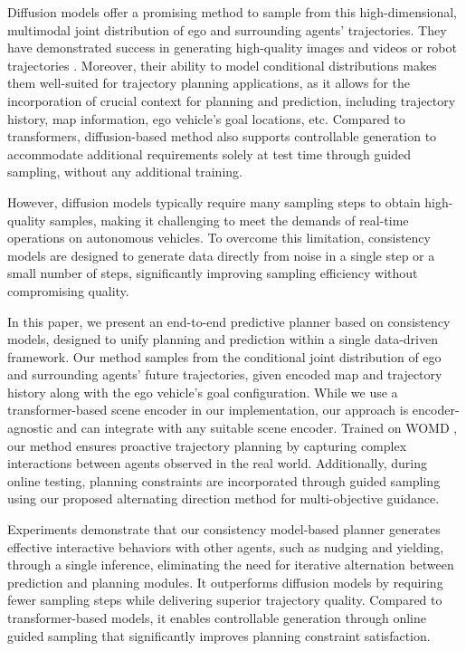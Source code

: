 Diffusion models \citep{song2020score,ho2020denoising} offer a promising method to sample from this high-dimensional, multimodal joint distribution of ego and surrounding agents' trajectories.
They have demonstrated success in generating high-quality images and videos \citep{rombach2022high,ho2022video} or robot trajectories \citep{rempe2023trace,jiang2023motiondiffuser}.
Moreover, their ability to model conditional distributions makes them well-suited for trajectory planning applications, as it allows for the incorporation of crucial context for planning and prediction, including trajectory history, map information, ego vehicle's goal locations, etc.
Compared to transformers,
diffusion-based method also supports controllable generation to accommodate additional requirements solely at test time through guided sampling, without any additional training.

However, diffusion models typically require many sampling steps to obtain high-quality samples, making it challenging to meet the demands of real-time operations on autonomous vehicles.
To overcome this limitation, consistency models \citep{song2023consistency} are designed to generate data directly from noise in a single step or a small number of steps, significantly improving sampling efficiency without compromising quality. 

In this paper, we present an end-to-end predictive planner based on consistency models, designed to unify planning and prediction within a single data-driven framework.
Our method samples from the conditional joint distribution of ego and surrounding agents' future trajectories, given encoded map and trajectory history along with the ego vehicle's goal configuration. 
While we use a transformer-based scene encoder \citep{shi2022motion} in our implementation, our approach is encoder-agnostic and can integrate with any suitable scene encoder. 
Trained on WOMD \cite{ettinger2021large}, our method ensures proactive trajectory planning by capturing complex interactions between agents observed in the real world.
Additionally, during online testing, planning constraints are incorporated through guided sampling using our proposed alternating direction method for multi-objective guidance.

Experiments demonstrate that our consistency model-based planner generates effective interactive behaviors with other agents, such as nudging and yielding, through a single inference, eliminating the need for iterative alternation between prediction and planning modules.
It outperforms diffusion models by requiring fewer sampling steps while delivering superior trajectory quality.
Compared to transformer-based models, it enables controllable generation through online guided sampling that significantly improves planning constraint satisfaction.
